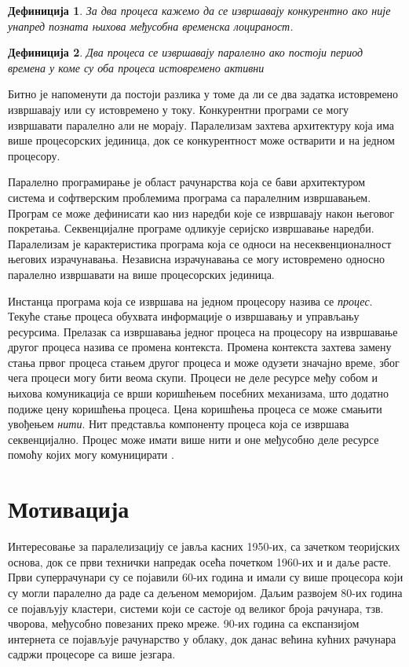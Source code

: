 \documentclass[12pt,oneside]{memoir}
\newtheorem{definic}{Дефиниција}
\begin{document}
\begin{definic}
	За два процеса кажемо да се извршавају конкурентно ако није унапред позната њихова међусобна временска лоцираност.
\end{definic}
\begin{definic}
	Два процеса се извршавају паралелно ако постоји период времена у коме су оба процеса истовремено активни
\end{definic}

Битно је напоменути да постоји разлика у томе да ли се два задатка истовремено извршавају или су истовремено у току. Конкурентни програми се могу извршавати паралелно али не морају. Паралелизам захтева архитектуру која има више процесорских јединица, док се конкурентност може остварити и на једном процесору.

 	Паралелно програмирање је област рачунарства која се бави архитектуром система и софтверским проблемима програма са паралелним извршавањем. Програм се може дефинисати као низ наредби које се извршавају након његовог покретања. Секвенцијалне програме одликује серијско извршавање наредби. Паралелизам је карактеристика програма која се односи на несеквенционалност његових израчунавања. Независна израчунавања се могу истовремено односно паралелно извршавати на више процесорских јединица.
 	
 	Инстанца програма која се извршава на једном процесору назива се \textit{процес}. Текуће стање процеса обухвата информације о извршавању и управљању ресурсима. Прелазак са извршавања једног процеса на процесору на извршавање другог процеса назива се промена контекста. Промена контекста захтева замену стања првог процеса стањем другог процеса и може одузети значајно време, због чега процеси могу бити веома скупи. Процеси не деле ресурсе међу собом и њихова комуникација се врши коришћењем посебних механизама, што додатно подиже цену коришћења процеса. Цена коришћења процеса се може смањити увођењем \textit{нити}. Нит представља компоненту процеса која се извршава секвенцијално. Процес може имати више нити и оне међусобно деле ресурсе помоћу којих могу комуницирати \cite{apue}. 
 	
 	  
 	
  \section{Мотивација}
  Интересовање за паралелизацију се јавља касних 1950-их, са зачетком теоријских основа, док се први технички напредак осећа почетком 1960-их и и даље расте. Први суперрачунари су се појавили 60-их година и имали су више процесора који су могли паралелно да раде са дељеном меморијом. Даљим развојем 80-их година се појављују кластери, системи који се састоје од великог броја рачунара, тзв. чворова, међусобно повезаних преко мреже. 90-их година са експанзијом интернета се појављује рачунарство у облаку, док данас већина кућних рачунара садржи процесоре са више језгара. 
  
\end{document}
